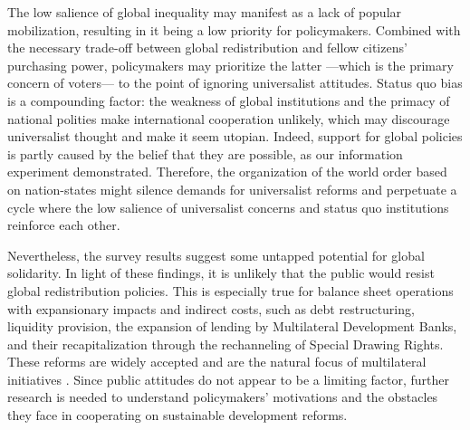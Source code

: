 \documentclass[12pt,english]{article}
\begin{document}
\begin{bibunit}
The low salience of global inequality may manifest as a lack of popular mobilization, resulting in it being a low priority for policymakers. Combined with the necessary trade-off between global redistribution and fellow citizens' purchasing power, policymakers may prioritize the latter ---which is the primary concern of voters--- to the point of ignoring universalist attitudes. 
Status quo bias is a compounding factor: the weakness of global institutions and the primacy of national polities make international cooperation unlikely, %
which may discourage universalist thought and make it seem utopian. %
Indeed, support for global policies is partly caused by the belief that they are possible, as our information experiment demonstrated. Therefore, the organization of the %
world order based on nation-states might silence demands for %
universalist reforms and perpetuate a cycle where the low salience of universalist concerns and status quo institutions reinforce each other. 

Nevertheless, the survey results %
suggest some untapped potential for global solidarity. In light of these findings, it is unlikely that the public would resist global redistribution policies. This is especially true for balance sheet operations with expansionary impacts and indirect costs, such as debt restructuring, liquidity provision, %
the expansion of lending by Multilateral Development Banks, and their recapitalization through the rechanneling of Special Drawing Rights. These reforms are widely accepted and are the natural focus of multilateral initiatives \citep{bridgetown_initiative_bridgetown_2025,ffd4_outcome_2025}. %
Since public attitudes do not appear to be a limiting factor, further research is needed to understand policymakers' motivations and the obstacles they face in cooperating on sustainable development reforms. 


\end{bibunit}
\end{document}
